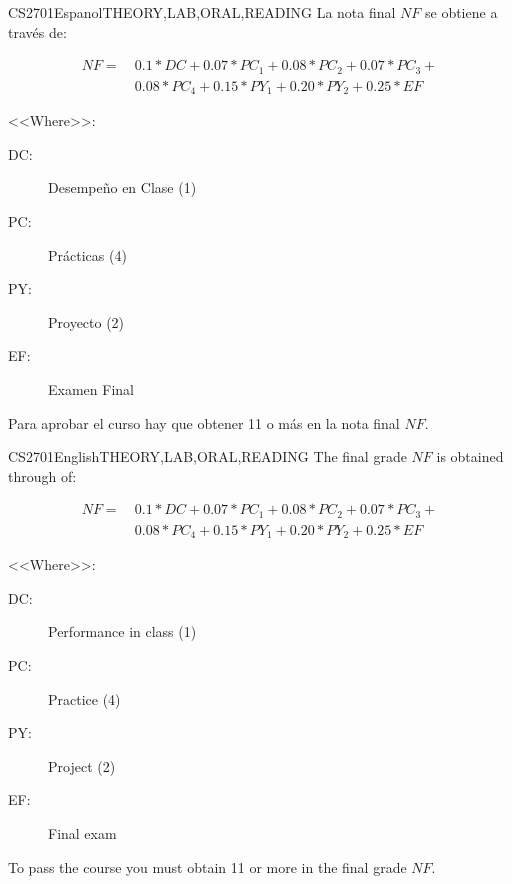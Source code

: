 \begin{evaluation}{CS2701}{Espanol}{THEORY,LAB,ORAL,READING}
La nota final $NF$ se obtiene a través de:

\begin{equation}
   \begin{split}
       NF =~  & 0.1* DC + 0.07*PC_{1} + 0.08*PC_{2} + 0.07*PC_{3} + \\ 
                   &  0.08*PC_{4} +  0.15*PY_{1} + 0.20*PY_{2} + 0.25*EF 
   \end{split}
\end{equation}

\noindent <<Where>>:
\begin{description}
    \item[DC:] Desempeño en Clase (1)
    \item[PC:] Prácticas (4)
    \item[PY:] Proyecto (2)
    \item[EF:] Examen Final
\end{description}
\noindent Para aprobar el curso hay que obtener 11 o más en la nota final $NF$.
\end{evaluation}

\begin{evaluation}{CS2701}{English}{THEORY,LAB,ORAL,READING}
The final grade $NF$ is obtained through of:

\begin{equation}
   \begin{split}
       NF =~  & 0.1* DC + 0.07*PC_{1} + 0.08*PC_{2} + 0.07*PC_{3} + \\ 
              &  0.08*PC_{4} +  0.15*PY_{1} + 0.20*PY_{2} + 0.25*EF 
   \end{split}
\end{equation}

\noindent <<Where>>:
\begin{description}
    \item[DC:] Performance in class (1)
    \item[PC:] Practice (4)
    \item[PY:] Project (2)
    \item[EF:] Final exam
\end{description}
\noindent To pass the course you must obtain 11 or more in the final grade $NF$.
\end{evaluation}



